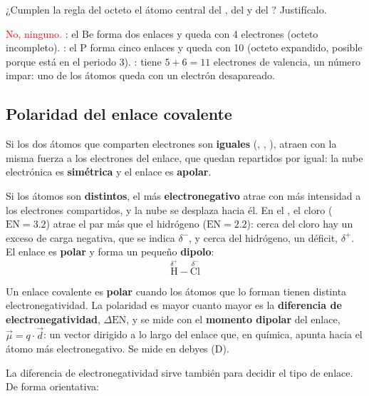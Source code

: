 \begin{exercise}
    ¿Cumplen la regla del octeto el átomo central del , del  y del ? Justifícalo.
    \begin{solu}
        \textcolor{red}{No, ninguno.} : el Be forma dos enlaces y queda con 4 electrones (octeto incompleto).
        : el P forma cinco enlaces y queda con 10 (octeto expandido, posible porque está en el periodo 3).
        : tiene \(5 + 6 = 11\) electrones de valencia, un número impar: uno de los átomos queda con un electrón desapareado.
    \end{solu}
\end{exercise}

\subsection{Polaridad del enlace covalente}

Si los dos átomos que comparten electrones son \textbf{iguales} (, , ), atraen con la misma fuerza a los
electrones del enlace, que quedan repartidos por igual: la nube electrónica es \textbf{simétrica} y el enlace es \textbf{apolar}.

Si los átomos son \textbf{distintos}, el más \textbf{electronegativo} atrae con más intensidad a los electrones compartidos, y la
nube se desplaza hacia él. En el , el cloro (\(\mathrm{EN} = \num{3.2}\)) atrae el par más que el hidrógeno
(\(\mathrm{EN} = \num{2.2}\)): cerca del cloro hay un exceso de carga negativa, que se indica \(\delta^-\), y cerca del hidrógeno, un
déficit, \(\delta^+\). El enlace es \textbf{polar} y forma un pequeño \textbf{dipolo}:
\[ \overset{\delta^+}{\mathrm{H}}{-}\overset{\delta^-}{\mathrm{Cl}} \]

\begin{definition}
    Un enlace covalente es \textbf{polar} cuando los átomos que lo forman tienen distinta electronegatividad. La polaridad es mayor
    cuanto mayor es la \textbf{diferencia de electronegatividad}, \(\Delta\mathrm{EN}\), y se mide con el \textbf{momento dipolar}
    del enlace, \(\vec{\mu} = q \cdot \vec{d}\): un vector dirigido a lo largo del enlace que, en química, apunta hacia el átomo
    más electronegativo. Se mide en debyes (D).
\end{definition}

La diferencia de electronegatividad sirve también para decidir el tipo de enlace. De forma orientativa:


